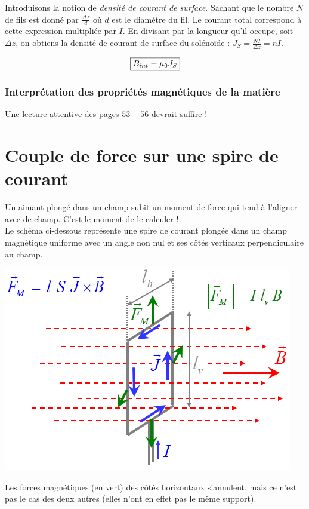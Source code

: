 \documentclass	[11pt, a4paper, openany]{book}
\begin{document}
Introduisons la notion de \textit{densité de courant de surface}. Sachant que le nombre $N$ de fils est donné par $\frac{\Delta z}{d}$ où $d$ est le diamètre du fil. Le courant total correspond à cette expression multipliée par $I$. En divisant par la longueur qu'il occupe, soit $\Delta z$, on obtiens la densité de courant de surface du solénoïde : $J_S = \frac{NI}{\Delta z} = nI$.

\begin{equation}
	\fbox{$B_{int} = \mu_0J_S$}
\end{equation}

\subsubsection{Interprétation des propriétés magnétiques de la matière}
Une lecture attentive des pages $53 - 56$ devrait suffire !

\section{Couple de force sur une spire de courant}
Un aimant plongé dans un champ subit un moment de force qui tend à l'aligner avec de champ. C'est le moment de le calculer ! \\
Le schéma ci-dessous représente une spire de courant plongée dans un champ magnétique uniforme avec un angle non nul et ses côtés verticaux perpendiculaire au champ.
\begin{center}
	\includegraphics[scale=0.50]{magneto/image13.png}
\end{center}

Les forces magnétiques (en vert) des côtés horizontaux s'annulent, mais ce n'est pas le cas des deux autres (elles n'ont en effet pas le même support).\\
\end{document}
